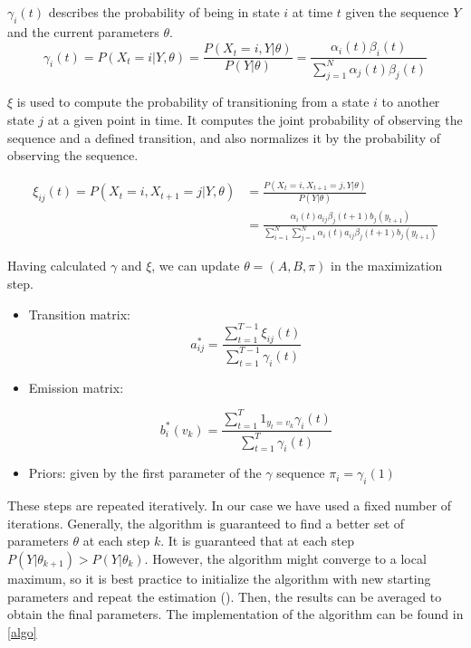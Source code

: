 \documentclass[12pt, authoryear]{elsarticle}
\begin{document}
$\gamma_i(t)$ describes the probability of being in state $i$ at time $t$ given the sequence $Y$ and the current parameters $\theta$. 
 $$ 
 \gamma_{i}(t)=P\left(X_{t}=i | Y, \theta\right)=\frac{P\left(X_{t}=i, Y | \theta \right)}{P(Y | \theta)}=\frac{\alpha_{i}(t) \beta_{i}(t)}{\sum_{j=1}^{N} \alpha_{j}(t) \beta_{j}(t)}
 $$
 
$\xi$ is used to compute the probability of transitioning from a state $i$ to another state $j$ at a given point in time. It computes the joint probability of observing the sequence and a defined transition, and also normalizes it by the probability of observing the sequence.
 
\begin{align*}
 \xi_{i j}(t) =P\left(X_{t}=i, X_{t+1}=j | Y, \theta \right) &=\frac{P\left(X_{t}=i, X_{t+1}=j, Y | \theta\right)}{P(Y | \theta)} \\
 &=\frac{\alpha_{i}(t) a_{i j} \beta_{j}(t+1) b_{j}\left(y_{t+1}\right)}{\sum_{i=1}^{N} \sum_{j=1}^{N} \alpha_{i}(t) a_{i j} \beta_{j}(t+1) b_{j}\left(y_{t+1}\right)}
\end{align*} 
 
Having calculated $\gamma$ and $\xi$, we can update $\theta = (A,B,\pi)$ in the maximization step.

\begin{itemize}
 	\item Transition matrix: $$ 
 	a_{i j}^{*}=\frac{\sum_{t=1}^{T-1} \xi_{i j}(t)}{\sum_{t=1}^{T-1} \gamma_{i}(t)}
 	$$
 	
 	\item Emission matrix: 
 	
 	$$ 
 	b_{i}^{*}\left(v_{k}\right)=\frac{\sum_{t=1}^{T} 1_{y_{t}=v_{k}} \gamma_{i}(t)}{\sum_{t=1}^{T} \gamma_{i}(t)}
 	$$
 	
 	\item Priors: given by the first parameter of the $\gamma$ sequence $\pi_{i}=\gamma_{i}(1)$
\end{itemize}

These steps are repeated iteratively. In our case we have used a fixed number of iterations. Generally, the algorithm is guaranteed to find a better set of parameters $\theta$ at each step $k$. It is guaranteed that at each step $P(Y|\theta_{k+1})>P(Y|\theta_{k})$. However, the algorithm might converge to a local maximum, so it is best practice to initialize the algorithm with new starting parameters and repeat the estimation (\cite{rabiner1989tutorial}). Then, the results can be averaged to obtain the final parameters. The implementation of the algorithm can be found in \ref{algo}
\end{document}
